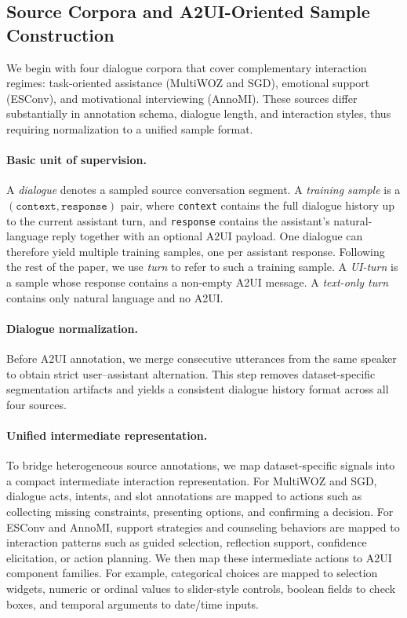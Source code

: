 \documentclass{llmxive}
\begin{document}
\subsection{Source Corpora and A2UI-Oriented Sample Construction}
\label{subsec:data-source}

We begin with four dialogue corpora that cover complementary interaction regimes: task-oriented assistance (MultiWOZ and SGD), emotional support (ESConv), and motivational interviewing (AnnoMI). These sources differ substantially in annotation schema, dialogue length, and interaction styles, thus requiring normalization to a unified sample format.

\paragraph{Basic unit of supervision.}
A \emph{dialogue} denotes a sampled source conversation segment. A \emph{training sample} is a $(\texttt{context}, \texttt{response})$ pair, where \texttt{context} contains the full dialogue history up to the current assistant turn, and \texttt{response} contains the assistant's natural-language reply together with an optional A2UI payload. One dialogue can therefore yield multiple training samples, one per assistant response. Following the rest of the paper, we use \emph{turn} to refer to such a training sample. A \emph{UI-turn} is a sample whose response contains a non-empty A2UI message. A \emph{text-only turn} contains only natural language and no A2UI.

\paragraph{Dialogue normalization.}
Before A2UI annotation, we merge consecutive utterances from the same speaker to obtain strict user--assistant alternation. This step removes dataset-specific segmentation artifacts and yields a consistent dialogue history format across all four sources.

\paragraph{Unified intermediate representation.}
To bridge heterogeneous source annotations, we map dataset-specific signals into a compact intermediate interaction representation. For MultiWOZ and SGD, dialogue acts, intents, and slot annotations are mapped to actions such as collecting missing constraints, presenting options, and confirming a decision. For ESConv and AnnoMI, support strategies and counseling behaviors are mapped to interaction patterns such as guided selection, reflection support, confidence elicitation, or action planning. We then map these intermediate actions to A2UI component families. For example, categorical choices are mapped to selection widgets, numeric or ordinal values to slider-style controls, boolean fields to check boxes, and temporal arguments to date/time inputs.
\end{document}
